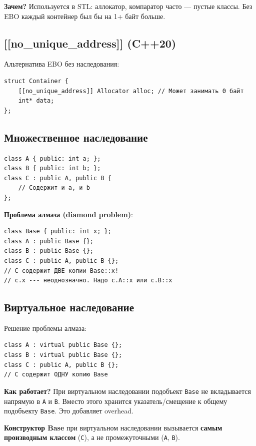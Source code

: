 \documentclass[12pt,a4paper]{article}
\begin{document}
\textbf{Зачем?} Используется в STL: аллокатор, компаратор часто --- пустые классы. Без EBO каждый контейнер был бы на 1+ байт больше.

\subsection{[[no\_unique\_address]] (C++20)}

Альтернатива EBO без наследования:
\begin{lstlisting}
struct Container {
    [[no_unique_address]] Allocator alloc; // Может занимать 0 байт
    int* data;
};
\end{lstlisting}

\subsection{Множественное наследование}

\begin{lstlisting}
class A { public: int a; };
class B { public: int b; };
class C : public A, public B {
    // Содержит и a, и b
};
\end{lstlisting}

\textbf{Проблема алмаза (diamond problem)}:
\begin{lstlisting}
class Base { public: int x; };
class A : public Base {};
class B : public Base {};
class C : public A, public B {};
// C содержит ДВЕ копии Base::x!
// c.x --- неоднозначно. Надо c.A::x или c.B::x
\end{lstlisting}

\subsection{Виртуальное наследование}

Решение проблемы алмаза:
\begin{lstlisting}
class A : virtual public Base {};
class B : virtual public Base {};
class C : public A, public B {};
// C содержит ОДНУ копию Base
\end{lstlisting}

\textbf{Как работает?} При виртуальном наследовании подобъект \texttt{Base} не вкладывается напрямую в \texttt{A} и \texttt{B}. Вместо этого хранится указатель/смещение к общему подобъекту \texttt{Base}. Это добавляет overhead.

\textbf{Конструктор Base} при виртуальном наследовании вызывается \textbf{самым производным классом} (\texttt{C}), а не промежуточными (\texttt{A}, \texttt{B}).
\end{document}
